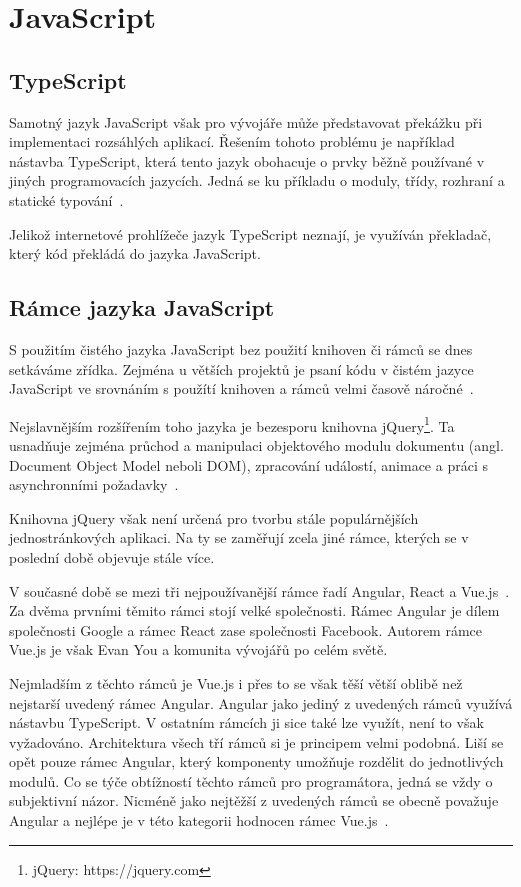 \blindtext %

\section{JavaScript}
\blindtext

\subsection{TypeScript}
Samotný jazyk JavaScript však pro vývojáře může představovat překážku při implementaci rozsáhlých aplikací. %
Řešením tohoto problému je například nástavba TypeScript, která tento jazyk obohacuje o prvky běžně používané v jiných programovacích jazycích. Jedná se ku příkladu o moduly, třídy, rozhraní a statické typování~\cite{bib:typescript}.
 
Jelikož internetové prohlížeče jazyk TypeScript neznají, je využíván překladač, který kód překládá do jazyka JavaScript.

\blindtext

\subsection{Rámce jazyka JavaScript}
S použitím čistého jazyka JavaScript bez použití knihoven či rámců se dnes setkáváme zřídka. Zejména u větších projektů je psaní kódu v čistém jazyce JavaScript ve srovnáním s použítí knihoven a rámců velmi časově náročné~\cite{bib:vanilla-js}.

Nejslavnějším rozšířením toho jazyka je bezesporu knihovna jQuery\footnote{jQuery: https://jquery.com}. Ta usnadňuje zejména průchod a manipulaci objektového modulu dokumentu (angl. Document Object Model neboli DOM), zpracování událostí, animace a práci s asynchronními požadavky~\cite{bib:jquery}.

Knihovna jQuery však není určená pro tvorbu stále populárnějších jednostránkových aplikaci. Na ty se zaměřují zcela jiné rámce, kterých se v poslední době objevuje stále více.

V současné době se mezi tři nejpoužívanější rámce řadí Angular, React a Vue.js~\cite{bib:js-framework}. Za dvěma prvními těmito rámci stojí velké společnosti. Rámec Angular je dílem společnosti Google a rámec React zase společnosti Facebook. Autorem rámce Vue.js je však Evan You a komunita vývojářů po celém světě.

Nejmladším z těchto rámců je Vue.js i přes to se však těší větší oblibě než nejstarší uvedený rámec Angular. Angular jako jediný z uvedených rámců využívá nástavbu TypeScript. V ostatním rámcích ji sice také lze využít, není to však vyžadováno. Architektura všech tří rámců si je principem velmi podobná. Liší se opět pouze rámec Angular, který komponenty umožňuje rozdělit do jednotlivých modulů. Co se týče obtížností těchto rámců pro programátora, jedná se vždy o subjektivní názor. Nicméně jako nejtěžší z uvedených rámců se obecně považuje Angular a nejlépe je v této kategorii hodnocen rámec Vue.js~\cite{bib:angular-vs-react-vs-vue}.




